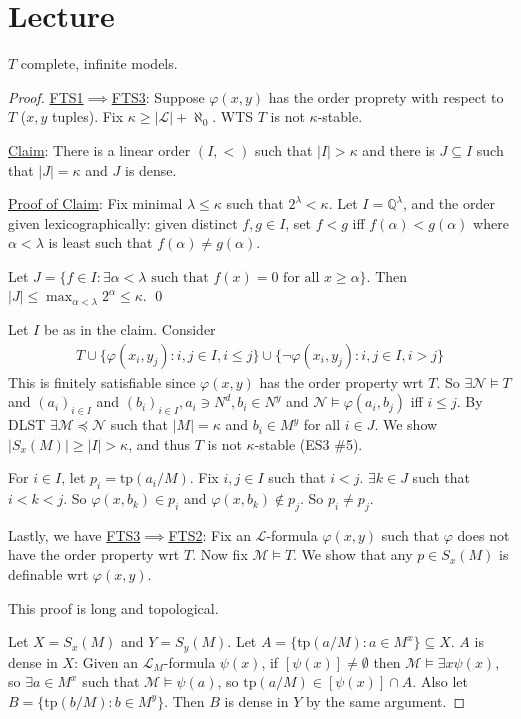 \documentclass[]{article}
\theoremstyle{custhm}
\theoremstyle{cusdef}
\theoremstyle{custhm}
\theoremstyle{custhm}
\theoremstyle{custhm}
\theoremstyle{ex}
\theoremstyle{custhm}
\theoremstyle{cusdef}
\theoremstyle{remark}
\theoremstyle{remark}
\theoremstyle{numremark}
\newcommand{\Q}{\mathbb{Q}}
\renewcommand{\L}{\mathcal{L}}
\newcommand{\M}{\mathcal{M}}
\renewcommand{\phi}{\varphi}
\newcommand{\tp}{\textrm{tp}}
\newcommand{\N}{\mathcal{N}}
\begin{document}
\section{Lecture}
$T$ complete, infinite models.
\begin{proof}\underline{FTS1$\implies$FTS3}:
	Suppose $\phi(x,y)$ has the order proprety with respect to $T$ ($x,y$ tuples). Fix $\kappa \ge |\L| + \aleph_0$. WTS $T$ is not $\kappa$-stable.

	\underline{Claim}: There is a  linear order $(I,<)$ such that $|I| > \kappa$ and there is $J \subseteq I$ such that $|J| = \kappa$ and $J$ is dense.

	\underline{Proof of Claim}: Fix minimal $\lambda \le \kappa$ such that $2^\lambda < \kappa$. Let $I = \Q^\lambda$, and the order given lexicographically: given distinct $f,g\in I$, set $f<g$ iff $f(\alpha) < g(\alpha)$ where $\alpha < \lambda$ is least such that $f(\alpha) \ne g(\alpha)$.

	Let $J = \{f\in I:\exists \alpha < \lambda \textrm{ such that }f(x) = 0\textrm{ for all }x\ge \alpha\}$. Then $|J| \le \max_{\alpha < \lambda}2^{\alpha}\le \kappa$. \qed

	Let $I$ be as in the claim. Consider
	\begin{align*}
		T \cup\{\phi(x_i,y_j):i,j\in I,i\le j\}\cup\{\neg\phi(x_i,y_j):i,j\in I,i>j\}
	\end{align*}
	This is finitely satisfiable since $\phi(x,y)$ has the order property wrt $T$. So $\exists \N\models T$ and $(a_i)_{i\in I}$ and $(b_i)_{i\in I}, a_i\ni N^d,b_i\in N^y$ and $\N\models \phi(a_i,b_j)$ iff $i\le j$. By DLST $\exists \M\preceq\N$ such that $|M| = \kappa$ and $b_i \in M^y$ for all $i\in J$. We show $|S_x(M)| \ge |I| > \kappa$, and thus $T$ is not $\kappa$-stable (ES3 \#5).
	
	For $i\in I$, let $p_i = \tp(a_i/M)$. Fix $i,j\in I$ such that $i<j$. $\exists k\in J$ such that $i < k < j$. So $\phi(x,b_k)\in p_i$ and $\phi(x,b_k)\not\in p_j$. So $p_i\ne p_j$. \qedsymbol

	Lastly, we have \underline{FTS3$\implies$FTS2}: Fix an $\L$-formula $\phi(x,y)$ such that $\phi$ does not have the order property wrt $T$. Now fix $\M\models T$. We show that any $p \in S_x(M)$ is definable wrt $\phi(x,y)$.

	This proof is long and topological.

	Let $X = S_x(M)$ and $Y= S_y(M)$. Let $A = \{\tp(a/M):a\in M^x\}\subseteq X$. $A$ is dense in $X$: Given an $\L_M$-formula $\psi(x)$, if $[\psi(x)]\ne\emptyset$ then $\M\models \exists x\psi(x)$, so $\exists a \in M^x$ such that $\M\models \psi(a)$, so $\tp(a/M)\in [\psi(x)]\cap A$. Also let $B = \{\tp(b/M):b\in M^y\}$. Then $B$ is dense in $Y$ by the same argument.


\end{proof}
\end{document}
